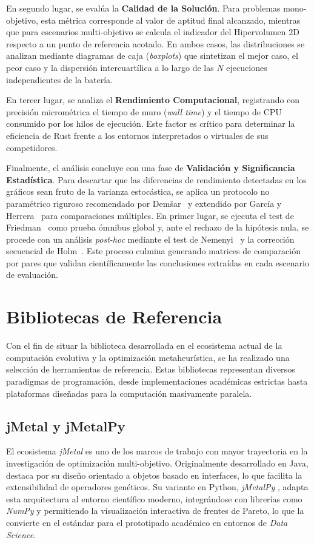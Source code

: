 \documentclass[12pt,a4paper,twoside,openright]{book}
\begin{document}
    En segundo lugar, se evalúa la \textbf{Calidad de la Solución}. Para problemas mono-objetivo, esta métrica corresponde al valor de aptitud final alcanzado, mientras que para escenarios multi-objetivo se calcula el indicador del Hipervolumen 2D respecto a un punto de referencia acotado. En ambos casos, las distribuciones se analizan mediante diagramas de caja (\textit{boxplots}) que sintetizan el mejor caso, el peor caso y la dispersión intercuartílica a lo largo de las $N$ ejecuciones independientes de la batería.

    En tercer lugar, se analiza el \textbf{Rendimiento Computacional}, registrando con precisión micrométrica el tiempo de muro (\textit{wall time}) y el tiempo de CPU consumido por los hilos de ejecución. Este factor es crítico para determinar la eficiencia de Rust frente a los entornos interpretados o virtuales de sus competidores.

    Finalmente, el análisis concluye con una fase de \textbf{Validación y Significancia Estadística}. Para descartar que las diferencias de rendimiento detectadas en los gráficos sean fruto de la varianza estocástica, se aplica un protocolo no paramétrico riguroso recomendado por Demšar~\cite{demsar2006statistical} y extendido por García y Herrera~\cite{garcia2008extension} para comparaciones múltiples. En primer lugar, se ejecuta el test de Friedman~\cite{friedman1940comparison} como prueba ómnibus global y, ante el rechazo de la hipótesis nula, se procede con un análisis \textit{post-hoc} mediante el test de Nemenyi~\cite{nemenyi1963distribution} y la corrección secuencial de Holm~\cite{holm1979simple}. Este proceso culmina generando matrices de comparación por pares que validan científicamente las conclusiones extraídas en cada escenario de evaluación.

\section{Bibliotecas de Referencia}

Con el fin de situar la biblioteca desarrollada en el ecosistema actual de la computación evolutiva y la optimización metaheurística, se ha realizado una selección de herramientas de referencia. Estas bibliotecas representan diversos paradigmas de programación, desde implementaciones académicas estrictas hasta plataformas diseñadas para la computación masivamente paralela.

    \subsection{jMetal y jMetalPy}
    El ecosistema \textit{jMetal} \cite{jmetal} es uno de los marcos de trabajo con mayor trayectoria en la investigación de optimización multi-objetivo. Originalmente desarrollado en Java, destaca por su diseño orientado a objetos basado en interfaces, lo que facilita la extensibilidad de operadores genéticos. Su variante en Python, \textit{jMetalPy} \cite{jmetalpy}, adapta esta arquitectura al entorno científico moderno, integrándose con librerías como \textit{NumPy} y permitiendo la visualización interactiva de frentes de Pareto, lo que la convierte en el estándar para el prototipado académico en entornos de \textit{Data Science}.
\end{document}
